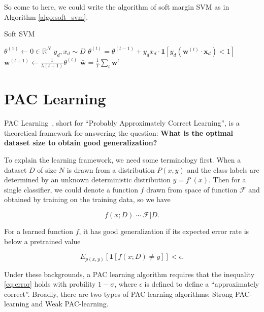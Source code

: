\documentclass[11pt]{article}
\begin{document}
So come to here, we could write the algorithm of soft margin SVM as in Algorithm \ref{algo:soft_svm}.

\begin{algorithm}[H]
\caption{Soft SVM}
\label{algo:soft_svm}
\begin{algorithmic}[1]
\STATE $\theta^{(1)} \longleftarrow 0 \in \mathbb{R}^N$
\STATE $y_d, x_d \sim D$
\STATE $\theta^{(t)} = \theta^{(t-1)} + y_d x_d \cdot \mathbf{1}[y_d (\mathbf{w}^{(t)} \cdot \mathbf{x}_d) < 1]$
\STATE $\mathbf{w}^{(t+1)} \longleftarrow \frac{1}{\lambda(t+1)} \theta^{(t)}$
\ENDFOR
\STATE $\bar{\mathbf{w}} = \frac{1}{T} \sum_t \mathbf{w}^t$
\end{algorithmic}
\end{algorithm}


\section{PAC Learning}

PAC Learning~\cite{valiant1984theory}, short for ``Probably Approximately Correct Learning'', is a theoretical framework for answering the question: \textbf{What is the optimal dataset size to obtain good generalization?}

To explain the learning framework, we need some terminology first. When a dataset $D$ of size $N$ is drawn from a distribution $P(x,y)$ and the class labels are determined by an unknown deterministic distribution $y = f^\star(x)$. Then for a single classifier, we could denote a function $f$ drawn from space of function $\mathcal{F}$ and obtained by training on the training data, so we have 

\begin{equation}
    f(x;D) \sim \mathcal{F} | D.
\end{equation}

For a learned function $f$, it has good generalization if its expected error rate is below a pretrained value 

\begin{equation}
E_{p(x,y)} [\mathbf{1}[f(x;D)\neq y]] < \epsilon.
\label{eq:error}
\end{equation}

Under these backgrounds, a PAC learning algorithm requires that the inequality \ref{eq:error} holds with probility $1 - \sigma$, where $\epsilon$ is defined to define a ``approximately correct''. Broadly, there are two types of PAC learning algorithms: Strong PAC-learning and Weak PAC-learning.
\end{document}
